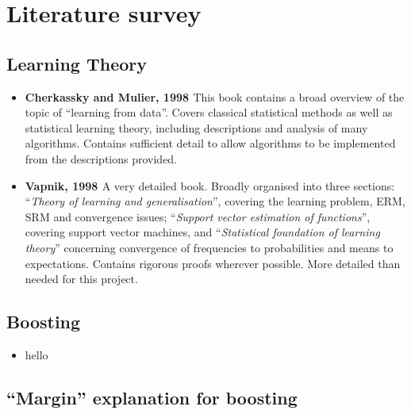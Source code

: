 \chapter{Literature survey}

\section{Learning Theory}

\begin{itemize}

\item	\textbf{Cherkassky and Mulier, 1998 \cite{Cherkassky98}}
	This book contains a broad overview of the topic of ``learning
	from data''.  Covers classical statistical methods as well as
	statistical learning theory, including descriptions and
	analysis of many algorithms.  Contains sufficient detail to
	allow algorithms to be implemented from the descriptions
	provided.

\item	\textbf{Vapnik, 1998 \cite{Vapnik98}}
	A very detailed book.  Broadly organised into three sections:
	``\emph{Theory of learning and generalisation}'', covering the
	learning problem, ERM, SRM and convergence issues;
	``\emph{Support vector estimation of functions}'', covering
	support vector machines, and ``\emph{Statistical foundation of
	learning theory}'' concerning convergence of frequencies to
	probabilities and means to expectations.  Contains rigorous
	proofs wherever possible.  More detailed than needed for this
	project.

\end{itemize}

\section{Boosting}

\begin{itemize}

\item hello

\end{itemize}


\section{``Margin'' explanation for boosting}
